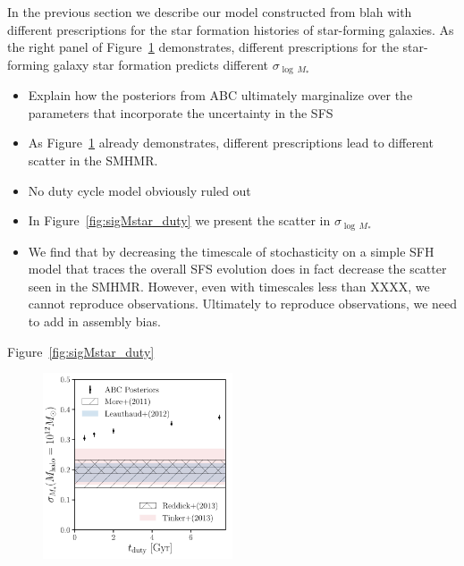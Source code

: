 \documentclass[12pt, letterpaper, preprint]{aastex}
\newcommand{\bitem}{\begin{itemize}}
\newcommand{\eitem}{\end{itemize}}
\begin{document}
In the previous section we describe our model constructed from blah with different
prescriptions for the star formation histories of star-forming galaxies. As the 
right panel of Figure~\ref{fig:abc_demo} demonstrates, different prescriptions for 
the star-forming galaxy star formation predicts different $\sigma_{\log\,M_*}$ 

\bitem
\item Explain how the posteriors from ABC ultimately marginalize over the parameters that incorporate the 
    uncertainty in the SFS 
\item As Figure~\ref{fig:abc_demo} already demonstrates, different prescriptions lead to different scatter in the SMHMR. 
\item No duty cycle model obviously ruled out 
\item In Figure~\ref{fig:sigMstar_duty} we present the scatter in $\sigma_{\log\,M_*}$
\item We find that by decreasing the timescale of stochasticity on a simple SFH model that traces the overall 
SFS evolution does in fact decrease the scatter seen in the SMHMR. However, even with timescales less
than XXXX, we cannot reproduce observations. Ultimately to reproduce observations, we need to add in 
assembly bias. 
\eitem

Figure~\ref{fig:sigMstar_duty} 

\begin{figure}
\begin{center}
\includegraphics[width=0.5\textwidth]{figs/sigMstar_tduty.pdf}
\caption{}
\label{fig:abc_demo}
\end{center}
\end{figure}
\end{document}
